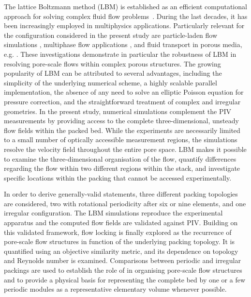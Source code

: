 The lattice Boltzmann method (LBM) is established as an efficient computational approach for solving complex fluid flow problems~\cite{kruger2017lattice,Sullivan}. During the last decades, it has been increasingly employed in multiphysics applications. Particularly relevant for the configuration considered in the present study are particle-laden flow simulations \cite{KRAUSE2017,Khalili2017, RETTINGER2018, GHARIBI2024,Gharibi2025}, multiphase flow applications \cite{Mazloomi2015,Liu2016,gharibi2020,fei2020,GHARIBI2024-2, wu2025}, and fluid transport in porous media, e.g. \cite{PAN2006, GHARIBI2020-2,STOCKINGER2024,Fei2023, ZHOU2026}. These investigations demonstrate in particular the robustness of LBM in resolving pore-scale flows within complex porous structures. The growing popularity of LBM can be attributed to several advantages, including the simplicity of the underlying numerical scheme, a highly scalable parallel implementation, the absence of any need to solve an elliptic Poisson equation for pressure correction, and the straightforward treatment of complex and irregular geometries. In the present study, numerical simulations complement the PIV measurements by providing access to the complete three-dimensional, unsteady flow fields within the packed bed. While the experiments are necessarily limited to a small number of optically accessible measurement regions, the simulations resolve the velocity field throughout the entire pore space. LBM makes it possible to examine the three-dimensional organisation of the flow, quantify differences regarding the flow within two different regions within the stack, and investigate specific locations within the packing that cannot be accessed experimentally.

In order to derive generally-valid statements, three different packing topologies are considered, two with rotational periodicity after six or nine elements, and one irregular configuration. The LBM simulations reproduce the experimental apparatus and the computed flow fields are validated against PIV. Building on this validated framework, flow locking is finally explored as the recurrence of pore-scale flow structures in function of the underlying packing topology. It is quantified using an objective similarity metric, and its dependence on topology and Reynolds number is examined. Comparisons between periodic and irregular packings are used to establish the role of  in organising pore-scale flow structures and to provide a physical basis for representing the complete bed by one or a few periodic modules as a representative elementary volume whenever possible.

